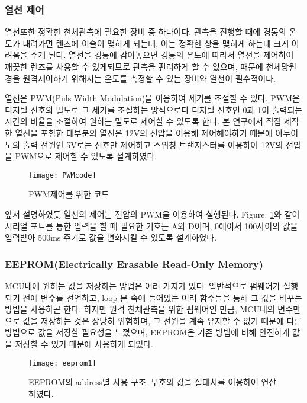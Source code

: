 \subsubsection{열선 제어}
열선또한 정확한 천체관측에 필요한 장비 중 하나이다. 관측을 진행할 때에 경통의 온도가 내려가면 렌즈에 이슬이 맺히게 되는데, 이는 정확한 상을 맺히게 하는데 크게 어려움을 주게 된다. 열선을 경통에 감아놓으면 경통의 온도에 따라서 열선을 제어하여 깨끗한 렌즈를 사용할 수 있게되므로 관측을 편리하게 할 수 있으며, 때문에 천체망원경을 원격제어하기 위해서는 온도를 측정할 수 있는 장비와 열선이 필수적이다. 

열선은 PWM(Puls Width Modulation)을 이용하여 세기를 조절할 수 있다. PWM은 디지털 신호의 밀도로 그 세기를 조절하는 방식으로다 디지털 신호인 0과 1이 출력되는 시간의 비율을 조절하여 원하는 밀도로 제어할 수 있도록 한다. 본 연구에서 직접 제작한 열선을 포함한 대부분의 열선은 12V의 전압을 이용해 제어해야하기 때문에 아두이노의 출력 전원인 5V로는 신호만 제어하고 스위칭 트랜지스터를 이용하여 12V의 전압을 PWM으로 제어할 수 있도록 설계하였다.


\begin{figure}[ht]
	\begin{center}
		\texttt{[image: PWMcode]}
	\end{center}
	\caption{PWM제어를 위한 코드}
	\label{PWM}
\end{figure}


앞서 설명하였듯 열선의 제어는 전압의 PWM을 이용하여 실행된다. \textrm{Figure}. \ref{PWM}와 같이 시리얼 포트를 통한 입력을 할 때 필요한 기호는 A와 D이며, 0에이서 100사이의 값을 입력받아 500ms 주기로 값을 변화시킬 수 있도록 설계하였다.

\subsubsection{EEPROM(Electrically Erasable Read-Only Memory)}

MCU내에 원하는 값을 저장하는 방법은 여러 가지가 있다. 일반적으로 펌웨어가 실행되기 전에 변수를 선언하고, loop 문 속에 들어있는 여러 함수들을 통해 그 값을 바꾸는 방법을 사용하곤 한다. 하지만 원격 천체관측을 위한 펌웨어인 만큼, MCU내의 변수만으로 값을 저장하는 것은 상당히 위험하며, 그 전원을 계속 유지할 수 없기 때문에 다른 방법으로 값을 저장할 필요성을 느꼈으며, EEPROM은 기존 방법에 비해 안전하게 값을 저장할 수 있기 때문에 사용하게 되었다.


\begin{figure}[h]
	\begin{center}
		\texttt{[image: eeprom1]}
	\end{center}
	\caption{EEPROM의 address별 사용 구조. 부호와 값을 절대치를 이용하여 연산하였다.}
	\label{eeprom1}
\end{figure}


